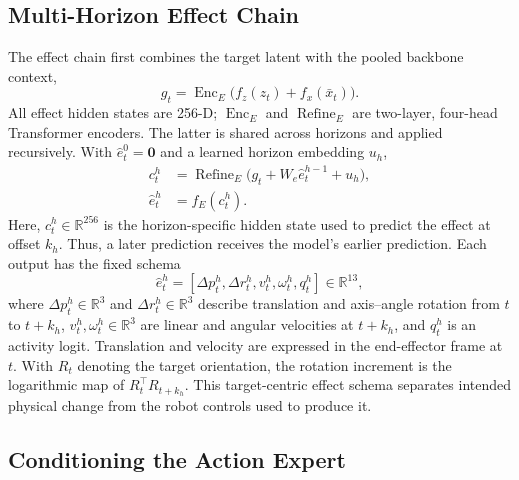 \documentclass[letterpaper,10pt,conference]{ieeeconf}
\begin{document}
\subsection{Multi-Horizon Effect Chain}

The effect chain first combines the target latent with the pooled backbone context,
\begin{equation}
g_t=\operatorname{Enc}_{E}
\bigl(f_z(z_t)+f_x(\bar x_t)\bigr).
\end{equation}
All effect hidden states are 256-D; $\operatorname{Enc}_{E}$ and $\operatorname{Refine}_{E}$ are two-layer, four-head Transformer encoders.
The latter is shared across horizons and applied recursively.
With $\hat e_t^0=\mathbf{0}$ and a learned horizon embedding $u_h$,
\begin{align}
c_t^h&=\operatorname{Refine}_{E}
\bigl(g_t+W_e\hat e_t^{h-1}+u_h\bigr), \\
\hat e_t^h&=f_E(c_t^h).
\label{eq:effect_ar}
\end{align}
Here, $c_t^h\in\mathbb{R}^{256}$ is the horizon-specific hidden state used to predict the effect at offset $k_h$.
Thus, a later prediction receives the model's earlier prediction.
Each output has the fixed schema
\begin{equation}
\hat e_t^h=[\Delta p_t^h,\Delta r_t^h,v_t^h,\omega_t^h,q_t^h]
\in\mathbb{R}^{13},
\label{eq:effect}
\end{equation}
where $\Delta p_t^h\in\mathbb{R}^{3}$ and $\Delta r_t^h\in\mathbb{R}^{3}$ describe translation and axis--angle rotation from $t$ to $t+k_h$, $v_t^h,\omega_t^h\in\mathbb{R}^{3}$ are linear and angular velocities at $t+k_h$, and $q_t^h$ is an activity logit.
Translation and velocity are expressed in the end-effector frame at $t$.
With $R_t$ denoting the target orientation, the rotation increment is the logarithmic map of $R_t^{\top}R_{t+k_h}$.
This target-centric effect schema separates intended physical change from the robot controls used to produce it.

\subsection{Conditioning the Action Expert}
\end{document}
